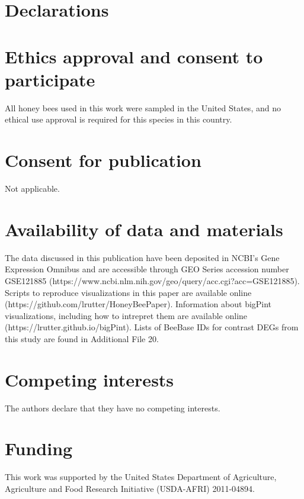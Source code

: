\documentclass{bmcart}
\begin{document}
\begin{linenumbers}
\begin{doublespacing}
\end{doublespacing} %


\section*{Declarations}

\begin{backmatter}

\section*{Ethics approval and consent to participate}
  All honey bees used in this work were sampled in the United States, and no ethical use approval is required for this species in this country.

\section*{Consent for publication}
  Not applicable.

\section*{Availability of data and materials}
  The data discussed in this publication have been deposited in NCBI's Gene Expression Omnibus \cite{geo} and are accessible through GEO Series accession number GSE121885 (https://www.ncbi.nlm.nih.gov/geo/query/acc.cgi?acc=GSE121885). Scripts to reproduce visualizations in this paper are available online (https://github.com/lrutter/HoneyBeePaper). Information about bigPint visualizations, including how to intrepret them are available online (https://lrutter.github.io/bigPint). Lists of BeeBase IDs for contrast DEGs from this study are found in Additional File 20. 

\section*{Competing interests}
  The authors declare that they have no competing interests.

\section*{Funding}
  This work was supported by the United States Department of Agriculture, Agriculture and Food Research Initiative (USDA-AFRI) 2011-04894.


\end{backmatter}
\end{linenumbers}
\end{document}

